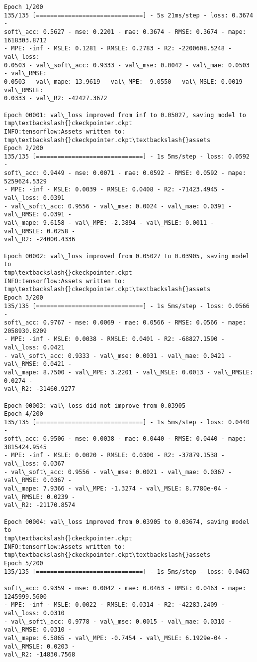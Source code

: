 \documentclass[11pt]{article}
\begin{document}
    \begin{Verbatim}[commandchars=\\\{\}]
Epoch 1/200
135/135 [==============================] - 5s 21ms/step - loss: 0.3674 -
soft\_acc: 0.5627 - mse: 0.2201 - mae: 0.3674 - RMSE: 0.3674 - mape: 1618303.8712
- MPE: -inf - MSLE: 0.1281 - RMSLE: 0.2783 - R2: -2200608.5248 - val\_loss:
0.0503 - val\_soft\_acc: 0.9333 - val\_mse: 0.0042 - val\_mae: 0.0503 - val\_RMSE:
0.0503 - val\_mape: 13.9619 - val\_MPE: -9.0550 - val\_MSLE: 0.0019 - val\_RMSLE:
0.0333 - val\_R2: -42427.3672

Epoch 00001: val\_loss improved from inf to 0.05027, saving model to
tmp\textbackslash{}ckeckpointer.ckpt
INFO:tensorflow:Assets written to: tmp\textbackslash{}ckeckpointer.ckpt\textbackslash{}assets
Epoch 2/200
135/135 [==============================] - 1s 5ms/step - loss: 0.0592 -
soft\_acc: 0.9449 - mse: 0.0071 - mae: 0.0592 - RMSE: 0.0592 - mape: 5259624.5329
- MPE: -inf - MSLE: 0.0039 - RMSLE: 0.0408 - R2: -71423.4945 - val\_loss: 0.0391
- val\_soft\_acc: 0.9556 - val\_mse: 0.0024 - val\_mae: 0.0391 - val\_RMSE: 0.0391 -
val\_mape: 9.6158 - val\_MPE: -2.3894 - val\_MSLE: 0.0011 - val\_RMSLE: 0.0258 -
val\_R2: -24000.4336

Epoch 00002: val\_loss improved from 0.05027 to 0.03905, saving model to
tmp\textbackslash{}ckeckpointer.ckpt
INFO:tensorflow:Assets written to: tmp\textbackslash{}ckeckpointer.ckpt\textbackslash{}assets
Epoch 3/200
135/135 [==============================] - 1s 5ms/step - loss: 0.0566 -
soft\_acc: 0.9767 - mse: 0.0069 - mae: 0.0566 - RMSE: 0.0566 - mape: 2058930.8209
- MPE: -inf - MSLE: 0.0038 - RMSLE: 0.0401 - R2: -68827.1590 - val\_loss: 0.0421
- val\_soft\_acc: 0.9333 - val\_mse: 0.0031 - val\_mae: 0.0421 - val\_RMSE: 0.0421 -
val\_mape: 8.7500 - val\_MPE: 3.2201 - val\_MSLE: 0.0013 - val\_RMSLE: 0.0274 -
val\_R2: -31460.9277

Epoch 00003: val\_loss did not improve from 0.03905
Epoch 4/200
135/135 [==============================] - 1s 5ms/step - loss: 0.0440 -
soft\_acc: 0.9506 - mse: 0.0038 - mae: 0.0440 - RMSE: 0.0440 - mape: 3815424.9545
- MPE: -inf - MSLE: 0.0020 - RMSLE: 0.0300 - R2: -37879.1538 - val\_loss: 0.0367
- val\_soft\_acc: 0.9556 - val\_mse: 0.0021 - val\_mae: 0.0367 - val\_RMSE: 0.0367 -
val\_mape: 7.9366 - val\_MPE: -1.3274 - val\_MSLE: 8.7780e-04 - val\_RMSLE: 0.0239 -
val\_R2: -21170.8574

Epoch 00004: val\_loss improved from 0.03905 to 0.03674, saving model to
tmp\textbackslash{}ckeckpointer.ckpt
INFO:tensorflow:Assets written to: tmp\textbackslash{}ckeckpointer.ckpt\textbackslash{}assets
Epoch 5/200
135/135 [==============================] - 1s 5ms/step - loss: 0.0463 -
soft\_acc: 0.9359 - mse: 0.0042 - mae: 0.0463 - RMSE: 0.0463 - mape: 1245999.5600
- MPE: -inf - MSLE: 0.0022 - RMSLE: 0.0314 - R2: -42283.2409 - val\_loss: 0.0310
- val\_soft\_acc: 0.9778 - val\_mse: 0.0015 - val\_mae: 0.0310 - val\_RMSE: 0.0310 -
val\_mape: 6.5865 - val\_MPE: -0.7454 - val\_MSLE: 6.1929e-04 - val\_RMSLE: 0.0203 -
val\_R2: -14830.7568


\end{Verbatim}
\end{document}
